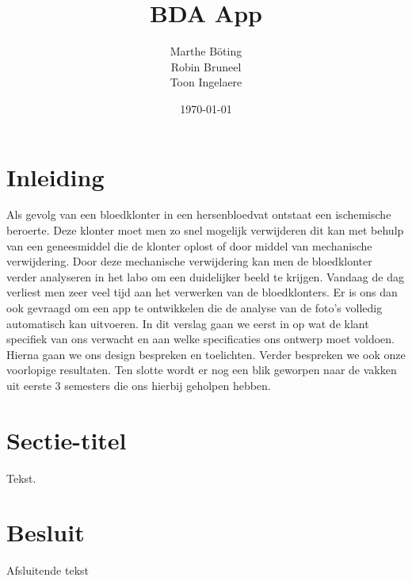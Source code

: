 \documentclass[a4paper,kulak]{kulakarticle}
\date{\today}
\title{BDA App}
\author{Marthe B\"{o}ting\\
	Robin Bruneel\\
	Toon Ingelaere}
\begin{document}
	
	\newpage
	\maketitle
	
	\section*{Inleiding}	
		Als gevolg van een bloedklonter in een hersenbloedvat ontstaat een ischemische beroerte. Deze klonter moet men zo snel mogelijk verwijderen dit kan met behulp van een geneesmiddel die de klonter oplost of door middel van mechanische verwijdering. Door deze mechanische verwijdering kan men de bloedklonter verder analyseren in het labo om een duidelijker beeld te krijgen.
		\newline
		Vandaag de dag verliest men zeer veel tijd aan het verwerken van de bloedklonters. Er is ons dan ook gevraagd om een app te ontwikkelen die de analyse van de foto’s volledig automatisch kan uitvoeren.
		\newline
		In dit verslag gaan we eerst in op wat de klant specifiek van ons verwacht en aan welke specificaties ons ontwerp moet voldoen. Hierna gaan we ons design bespreken en toelichten. Verder bespreken we ook onze voorlopige resultaten. Ten slotte wordt er nog een blik geworpen naar de vakken uit eerste 3 semesters die ons hierbij geholpen hebben.
	
	\newpage	
	\tableofcontents

	\section{Sectie-titel}	
		Tekst.
	
	\section*{Besluit}	
		Afsluitende tekst
\end{document}
